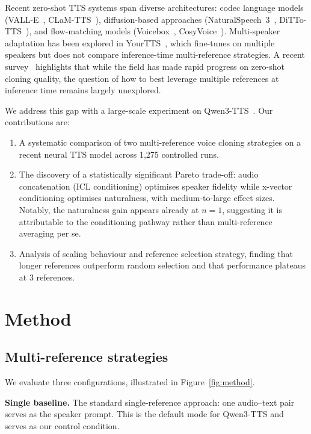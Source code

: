 \documentclass{Interspeech}
\begin{document}
Recent zero-shot TTS systems span diverse architectures: codec language models (VALL-E~\cite{valle}, CLaM-TTS~\cite{clamtts}), diffusion-based approaches (NaturalSpeech~3~\cite{naturalspeech3}, DiTTo-TTS~\cite{dittotts}), and flow-matching models (Voicebox~\cite{voicebox}, CosyVoice~\cite{cosyvoice}).
Multi-speaker adaptation has been explored in YourTTS~\cite{yourtts}, which fine-tunes on multiple speakers but does not compare inference-time multi-reference strategies.
A recent survey~\cite{vcsurvey} highlights that while the field has made rapid progress on zero-shot cloning quality, the question of how to best leverage multiple references at inference time remains largely unexplored.

We address this gap with a large-scale experiment on Qwen3-TTS~\cite{qwen3tts}.
Our contributions are:
\begin{enumerate}
  \item A systematic comparison of two multi-reference voice cloning strategies on a recent neural TTS model across 1{,}275 controlled runs.
  \item The discovery of a statistically significant Pareto trade-off: audio concatenation (ICL conditioning) optimises speaker fidelity while x-vector conditioning optimises naturalness, with medium-to-large effect sizes. Notably, the naturalness gain appears already at $n{=}1$, suggesting it is attributable to the conditioning pathway rather than multi-reference averaging per se.
  \item Analysis of scaling behaviour and reference selection strategy, finding that longer references outperform random selection and that performance plateaus at 3 references.
\end{enumerate}

\section{Method}
\label{sec:method}

\subsection{Multi-reference strategies}
\label{sec:strategies}

We evaluate three configurations, illustrated in Figure~\ref{fig:method}.

\textbf{Single baseline.}
The standard single-reference approach: one audio--text pair serves as the speaker prompt.
This is the default mode for Qwen3-TTS and serves as our control condition.
\end{document}
